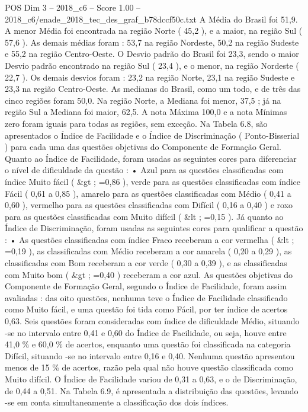 \begin{textsample}{POS Dim 3 – 2018\_c6 – Score 1.00 – 2018\_c6/enade\_2018\_tec\_des\_graf\_b78dccf50c.txt}
A Média do Brasil foi 51,9.
A menor Média foi encontrada na região Norte ( 45,2 ), e a maior, na região Sul ( 57,6 ).
As demais médias foram : 53,7 na região Nordeste, 50,2 na região Sudeste e 55,2 na região Centro-Oeste.
O Desvio padrão do Brasil foi 23,3, sendo o maior Desvio padrão encontrado na região Sul ( 23,4 ), e o menor, na região Nordeste ( 22,7 ).
Os demais desvios foram : 23,2 na região Norte, 23,1 na região Sudeste e 23,3 na região Centro-Oeste.
As medianas do Brasil, como um todo, e de três das cinco regiões foram 50,0.
Na região Norte, a Mediana foi menor, 37,5 ; já na região Sul a Mediana foi maior, 62,5.
A nota Máxima 100,0 e a nota Mínimas zero foram iguais para todas as regiões, sem exceção.
Na Tabela 6.8, são apresentados o Índice de Facilidade e o Índice de Discriminação ( Ponto-Bisserial ) para cada uma das questões objetivas do Componente de Formação Geral.
Quanto ao Índice de Facilidade, foram usadas as seguintes cores para diferenciar o nível de dificuldade da questão : • Azul para as questões classificadas com índice Muito fácil ( \&gt ; =0,86 ), verde para as questões classificadas com índice Fácil ( 0,61 a 0,85 ), amarelo para as questões classificadas com Médio ( 0,41 a 0,60 ), vermelho para as questões classificadas com Difícil ( 0,16 a 0,40 ) e roxo para as questões classificadas com Muito difícil ( \&lt ; =0,15 ).
Já quanto ao Índice de Discriminação, foram usadas as seguintes cores para qualificar a questão : • As questões classificadas com índice Fraco receberam a cor vermelha ( \&lt ; =0,19 ), as classificadas com Médio receberam a cor amarela ( 0,20 a 0,29 ), as classificadas com Bom receberam a cor verde ( 0,30 a 0,39 ), e as classificadas com Muito bom ( \&gt ; =0,40 ) receberam a cor azul.
As questões objetivas do Componente de Formação Geral, segundo o Índice de Facilidade, foram assim avaliadas : das oito questões, nenhuma teve o Índice de Facilidade classificado como Muito fácil, e uma questão foi tida como Fácil, por ter índice de acertos 0,63.
Seis questões foram consideradas com índice de dificuldade Médio, situando -se no intervalo entre 0,41 e 0,60 do Índice de Facilidade, ou seja, houve entre 41,0 \% e 60,0 \% de acertos, enquanto uma questão foi classificada na categoria Difícil, situando -se no intervalo entre 0,16 e 0,40.
Nenhuma questão apresentou menos de 15 \% de acertos, razão pela qual não houve questão classificada como Muito difícil.
O Índice de Facilidade variou de 0,31 a 0,63, e o de Discriminação, de 0,44 a 0,51.
Na Tabela 6.9, é apresentada a distribuição das questões, levando -se em conta simultaneamente a classificação dos dois índices.

\end{textsample}
